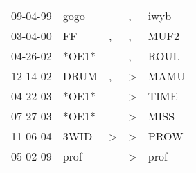 \begin{supertabular}{p{0.07\textwidth}p{0.06\textwidth}p{0.02\textwidth}p{0.02\textwidth}p{0.06\textwidth}}
 09-04-99\textsuperscript{} &  gogo\textsuperscript{} &               &             , &  iwyb\textsuperscript{} \\
 03-04-00\textsuperscript{} &    FF\textsuperscript{} &             , &             , &  MUF2\textsuperscript{} \\
 04-26-02\textsuperscript{} &                   *OE1* &               &             , &  ROUL\textsuperscript{} \\
 12-14-02\textsuperscript{} &  DRUM\textsuperscript{} &             , &  \textgreater &  MAMU\textsuperscript{} \\
 04-22-03\textsuperscript{} &                   *OE1* &               &  \textgreater &  TIME\textsuperscript{} \\
 07-27-03\textsuperscript{} &                   *OE1* &               &  \textgreater &  MISS\textsuperscript{} \\
 11-06-04\textsuperscript{} &  3WID\textsuperscript{} &  \textgreater &  \textgreater &  PROW\textsuperscript{} \\
 05-02-09\textsuperscript{} &  prof\textsuperscript{} &               &  \textgreater &  prof\textsuperscript{} \\
\end{supertabular}

